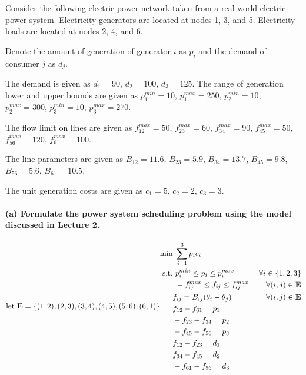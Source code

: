 \documentclass[11pt]{article}
\begin{document}
Consider the following electric power network taken from a real-world
electric power system. Electricity generators are located at nodes 1, 3,
and 5. Electricity loads are located at nodes 2, 4, and 6.

Denote the amount of generation of generator \(i\) as \(p_i\) and the
demand of consumer \(j\) as \(d_j\).

The demand is given as \(d_1 = 90\), \(d_2 = 100\), \(d_3 = 125\). The
range of generation lower and upper bounds are given as
\(p_1^{min} = 10\), \(p_1^{max} = 250\), \(p_2^{min} = 10\),
\(p_2^{max} = 300\), \(p_3^{min} = 10\), \(p_3^{max} = 270\).

The flow limit on lines are given as \(f_{12}^{max} = 50\),
\(f_{23}^{max} = 60\), \(f_{34}^{max} = 90\), \(f_{45}^{max} = 50\),
\(f_{56}^{max} = 120\), \(f_{61}^{max} = 100\).

The line parameters are given as \(B_{12} = 11.6\), \(B_{23} = 5.9\),
\(B_{34} = 13.7\), \(B_{45} = 9.8\), \(B_{56} = 5.6\),
\(B_{61} = 10.5\).

The unit generation costs are given as \(c_1 = 5\), \(c_2 = 2\),
\(c_3 = 3\).

\hypertarget{a-formulate-the-power-system-scheduling-problem-using-the-model-discussed-in-lecture-2.}{%
\paragraph{(a) Formulate the power system scheduling problem using the
model discussed in Lecture
2.}\label{a-formulate-the-power-system-scheduling-problem-using-the-model-discussed-in-lecture-2.}}

\(\text{let} \ \mathbf{E} = \{(1,2),(2,3),(3,4),(4,5),(5,6),(6,1)\} \\ \begin{aligned} \text{min} & \ \sum_{i=1}^{3} p_ic_i \\ \text{s.t.} & \ p_i^{min} \le p_i \le p_i^{max} \ & \forall i \in \{1,2,3\} \\  & \ -f_{ij}^{max} \le f_{ij} \le f_{ij}^{max} \ & \forall (i,j) \in \mathbf{E} \\  & f_{ij} = B_{ij}(\theta_i - \theta_j) \ & \forall (i,j) \in \mathbf{E} \\  & f_{12} - f_{61} = p_1 \\  & -f_{23} + f_{34} = p_2 \\  & -f_{45} + f_{56} = p_3 \\  & f_{12} - f_{23} = d_1 \\  & f_{34} - f_{45} = d_2 \\  & -f_{61} + f_{56} = d_3 \\ \end{aligned}\)
\end{document}
